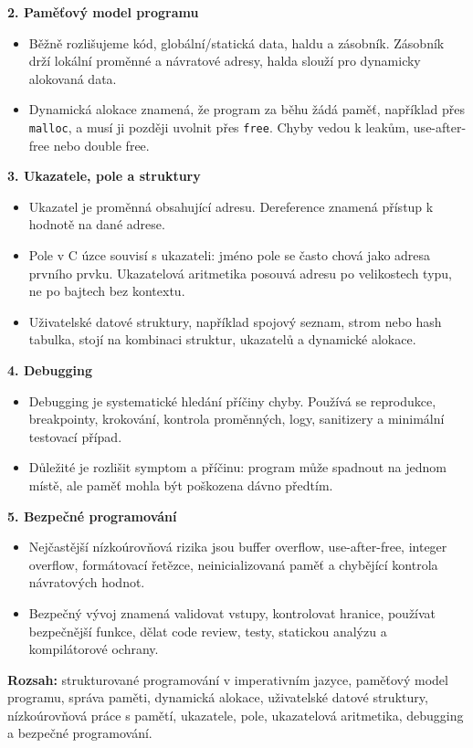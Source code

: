 \documentclass[11pt,a4paper]{article}
\newcommand{\itbox}[1]{\medskip\noindent\colorbox{black!6}{\parbox{\dimexpr\linewidth-2\fboxsep}{#1}}\medskip}
\begin{document}
\textbf{2. Paměťový model programu}
\begin{itemize}
  \item Běžně rozlišujeme kód, globální/statická data, haldu a zásobník. Zásobník drží lokální proměnné a návratové adresy, halda slouží pro dynamicky alokovaná data.
  \item Dynamická alokace znamená, že program za běhu žádá paměť, například přes \texttt{malloc}, a musí ji později uvolnit přes \texttt{free}. Chyby vedou k leakům, use-after-free nebo double free.
\end{itemize}

\textbf{3. Ukazatele, pole a struktury}
\begin{itemize}
  \item Ukazatel je proměnná obsahující adresu. Dereference znamená přístup k hodnotě na dané adrese.
  \item Pole v C úzce souvisí s ukazateli: jméno pole se často chová jako adresa prvního prvku. Ukazatelová aritmetika posouvá adresu po velikostech typu, ne po bajtech bez kontextu.
  \item Uživatelské datové struktury, například spojový seznam, strom nebo hash tabulka, stojí na kombinaci struktur, ukazatelů a dynamické alokace.
\end{itemize}

\textbf{4. Debugging}
\begin{itemize}
  \item Debugging je systematické hledání příčiny chyby. Používá se reprodukce, breakpointy, krokování, kontrola proměnných, logy, sanitizery a minimální testovací případ.
  \item Důležité je rozlišit symptom a příčinu: program může spadnout na jednom místě, ale paměť mohla být poškozena dávno předtím.
\end{itemize}

\textbf{5. Bezpečné programování}
\begin{itemize}
  \item Nejčastější nízkoúrovňová rizika jsou buffer overflow, use-after-free, integer overflow, formátovací řetězce, neinicializovaná paměť a chybějící kontrola návratových hodnot.
  \item Bezpečný vývoj znamená validovat vstupy, kontrolovat hranice, používat bezpečnější funkce, dělat code review, testy, statickou analýzu a kompilátorové ochrany.
\end{itemize}

\itbox{\textbf{Rozsah:} strukturované programování v imperativním jazyce, paměťový model programu, správa paměti, dynamická alokace, uživatelské datové struktury, nízkoúrovňová práce s pamětí, ukazatele, pole, ukazatelová aritmetika, debugging a bezpečné programování.}
\end{document}
